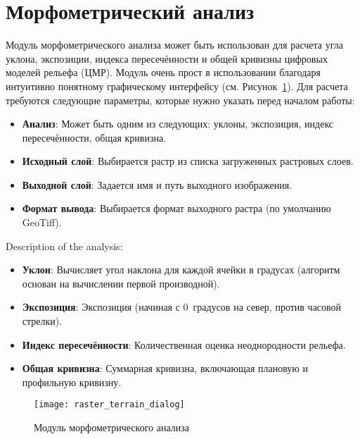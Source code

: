 
\section{Морфометрический анализ}\label{sec:rasterrain}


Модуль морфометрического анализа  может быть использован для расчета
угла уклона, экспозиции, индекса пересечённости и общей кривизны цифровых
моделей рельефа (ЦМР). Модуль очень прост в использовании благодаря
интуитивно понятному графическому интерфейсу
(см. Рисунок~\ref{fig:raster_terrain_dialog}). Для расчета требуются
следующие параметры, которые нужно указать перед началом работы:

\begin{itemize}[label=--]
\item \textbf{Анализ}: Может быть одним из следующих: уклоны,
экспозиция, индекс пересечённости, общая кривизна.
\item \textbf{Исходный слой}: Выбирается растр из списка загруженных растровых
слоев.
\item \textbf{Выходной слой}: Задается имя и путь выходного изображения.
\item \textbf{Формат вывода}: Выбирается формат выходного растра (по
умолчанию GeoTiff).
\end{itemize}

Description of the analysis:

\begin{itemize}[label=--]
\item \textbf{Уклон}: Вычисляет угол наклона для каждой ячейки в градусах (алгоритм
основан на вычислении первой производной).
\item \textbf{Экспозиция}: Экспозиция (начиная с 0~градусов на север, против часовой стрелки).
\item \textbf{Индекс пересечённости}: Количественная оценка неоднородности рельефа.
\item \textbf{Общая кривизна}: Суммарная кривизна, включающая плановую и профильную кривизну.
\end{itemize}

\begin{figure}[ht]
   \centering
   \texttt{[image: raster\_terrain\_dialog]}
   \caption{Модуль морфометрического анализа \wincaption}\label{fig:raster_terrain_dialog}
\end{figure}

